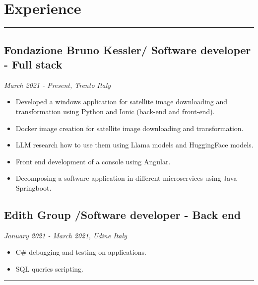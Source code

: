 \documentclass[a4paper,10pt]{article}
\begin{document}
\begin{minipage}[t]{0.25\textwidth}
    \section*{Experience}
    \vspace{7.3cm} %
    \rule{0.6cm}{0.3mm}
\end{minipage}
\hfill
\begin{minipage}[t]{0.75\textwidth}
     \subsection*{Fondazione Bruno Kessler/ Software developer - Full stack}
    \textit{ March 2021 - Present, Trento Italy  } \\
    \begin{itemize}[leftmargin=1cm]
        \item Developed a windows application for satellite image downloading and transformation using Python and Ionic (back-end and front-end).
        \item Docker image creation for satellite image downloading and transformation.
        \item LLM research how to use them using Llama models and HuggingFace models.
        \item Front end development of a console using Angular.
        \item Decomposing a software application in different microservices using Java Springboot.
    \end{itemize}
    \vspace{0.2cm} %
    \subsection*{Edith Group /Software developer - Back end}
    \textit{January 2021 - March 2021, Udine Italy} \\
    \begin{itemize}[leftmargin=1cm]
        \item C\# debugging and testing on applications.
        \item SQL queries scripting.
    \end{itemize}
    \rule{\linewidth}{0.5mm}
\end{minipage}
\end{document}
